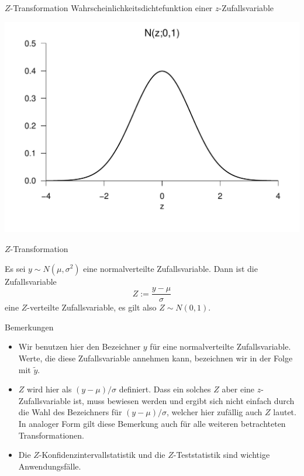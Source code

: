 \documentclass[
  8pt,
  ignorenonframetext,
]{beamer}
\begin{document}
\begin{frame}{\(Z\)-Transformation}
\protect\hypertarget{z-transformation-1}{}
Wahrscheinlichkeitsdichtefunktion einer \(z\)-Zufallsvariable \vfill
\vspace{5mm}

\begin{center}\includegraphics[width=0.7\linewidth]{8_Abbildungen/wtfi_8_z_verteilung} \end{center}
\vfill
\end{frame}

\begin{frame}{\(Z\)-Transformation}
\protect\hypertarget{z-transformation-2}{}
\small
\begin{theorem}[$Z$-Transformation]
\justifying
\normalfont
Es sei $y \sim N(\mu,\sigma^2)$ eine normalverteilte Zufallsvariable. Dann ist
die Zufallsvariable
\begin{equation}
Z := \frac{y - \mu}{\sigma}
\end{equation}
eine $Z$-verteilte Zufallsvariable, es gilt also $Z \sim N(0,1)$.
\end{theorem}

\footnotesize

Bemerkungen

\begin{itemize}
\item
  \justifying Wir benutzen hier den Bezeichner \(y\) für eine
  normalverteilte Zufallsvariable. Werte, die diese Zufallsvariable
  annehmen kann, bezeichnen wir in der Folge mit \(\tilde{y}\).
\item
  \justifying \(Z\) wird hier als \((y-\mu)/\sigma\) definiert. Dass ein
  solches \(Z\) aber eine \(z\)-Zufallsvariable ist, muss bewiesen
  werden und ergibt sich nicht einfach durch die Wahl des Bezeichners
  für \((y - \mu)/\sigma\), welcher hier zufällig auch \(Z\) lautet. In
  analoger Form gilt diese Bemerkung auch für alle weiteren betrachteten
  Transformationen.
\item
  Die \(Z\)-Konfidenzintervallstatistik und die \(Z\)-Teststatistik sind
  wichtige Anwendungsfälle.
\end{itemize}
\end{frame}
\end{document}
